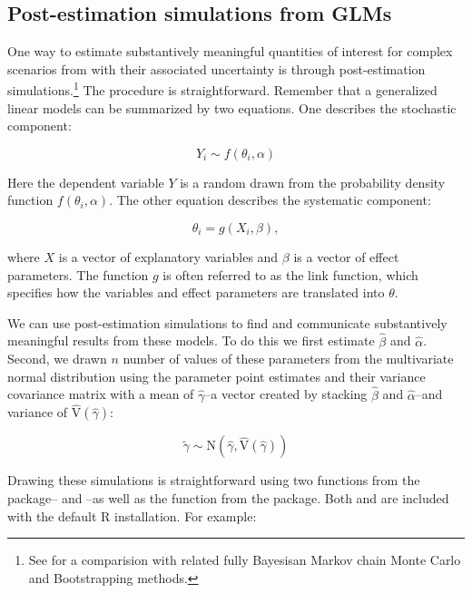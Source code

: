 \subsection{Post-estimation simulations from
GLMs}\label{post-estimation-simulations-from-glms}

One way to estimate substantively meaningful quantities of interest for
complex scenarios from with their associated uncertainty is through
post-estimation
simulations.\footnote{See \citet{King2000} for a comparision with related fully Bayesisan Markov chain Monte Carlo and Bootstrapping methods.}
The procedure is straightforward. Remember that a generalized linear
models can be summarized by two equations. One describes the stochastic
component:

\begin{equation}
Y_{i} \sim f(\theta_{i}, \alpha)
\end{equation}

\noindent Here the dependent variable \(Y\) is a random drawn from the
probability density function \(f(\theta_{i}, \alpha)\). The other
equation describes the systematic component:

\begin{equation}
\theta_{i} = g(X_{i}, \beta),
\end{equation}

where \(X\) is a vector of explanatory variables and \(\beta\) is a
vector of effect parameters. The function \(g\) is often referred to as
the link function, which specifies how the variables and effect
parameters are translated into \(\theta\).

We can use post-estimation simulations to find and communicate
substantively meaningful results from these models. To do this we first
estimate \(\hat{\beta}\) and \(\hat{\alpha}\). Second, we drawn \(n\)
number of values of these parameters from the multivariate normal
distribution using the parameter point estimates and their variance
covariance matrix with a mean of \(\hat{\gamma}\)--a vector created by
stacking \(\hat{\beta}\) and \(\hat{\alpha}\)--and variance of
\(\hat{\mathrm{V}}(\hat{\gamma})\):

\begin{equation}
\widetilde{\gamma} \sim \mathrm{N}(\hat{\gamma}, \hat{\mathrm{V}}(\hat{\gamma})) 
\end{equation}

Drawing these simulations is straightforward using two functions from
the  package-- and --as well as the
 function from the  package. Both
 and  are included with the default R
installation. For example:

